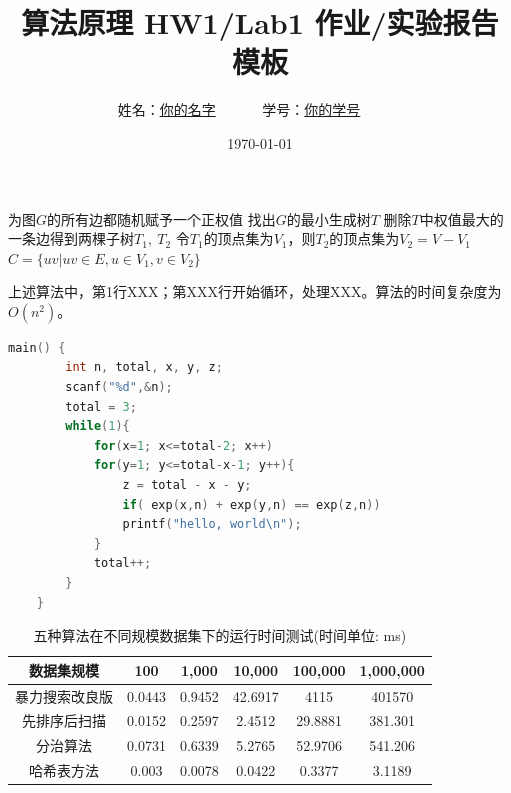 \documentclass[UTF8,12pt,a4paper]{ctexart}
\title{算法原理 HW1/Lab1 作业/实验报告模板}
\author{
	姓名：\underline{你的名字}~~~~~~
	学号：\underline{你的学号}~~~~~~}
\date{\today}
\begin{document}
\fancyfoot[C]{\thepage}

\maketitle




\begin{algorithm}[H]%
	\caption{RAND-MIN-CUT($G=(V,E)$)}
	\begin{algorithmic}[1]
		\State 为图$G$的所有边都随机赋予一个正权值
		\State 找出$G$的最小生成树$T$
		\State 删除$T$中权值最大的一条边得到两棵子树$T_1,~T_2$
		\State 令$T_1$的顶点集为$V_1$，则$T_2$的顶点集为$V_2=V-V_1$
		\State $C=\{ uv|uv\in E, u\in V_1, v\in V_2 \}$
		\State {}
	\end{algorithmic}
\end{algorithm}

上述算法中，第1行XXX；第XXX行开始循环，处理XXX。算法的时间复杂度为$O(n^2)$。



\begin{lstlisting}[language={C++}, basicstyle=\ttfamily\small]
	main() {
		int n, total, x, y, z;
		scanf("%d",&n);
		total = 3;
		while(1){
			for(x=1; x<=total-2; x++)
			for(y=1; y<=total-x-1; y++){
				z = total - x - y;
				if( exp(x,n) + exp(y,n) == exp(z,n))
				printf("hello, world\n");
			}
			total++;
		}
	}
\end{lstlisting}


\begin{table}[h]
    \centering
    \begin{tabular}{|c|c|c|c|c|c|}
    \hline
    数据集规模 & 100 & 1,000 & 10,000 & 100,000 & 1,000,000 \\
    \hline
    暴力搜索改良版 & 0.0443 & 0.9452 & 42.6917 & 4115 & 401570\\
    \hline
    先排序后扫描 & 0.0152 & 0.2597 & 2.4512 & 29.8881 & 381.301\\
    \hline
    分治算法 & 0.0731 & 0.6339 & 5.2765 & 52.9706 & 541.206\\
    \hline
    哈希表方法 & 0.003 & 0.0078 & 0.0422 & 0.3377 & 3.1189\\
    \hline
\end{tabular}
\caption{五种算法在不同规模数据集下的运行时间测试(时间单位: ms)}
\label{tab:time_results}
\end{table}
\end{document}
